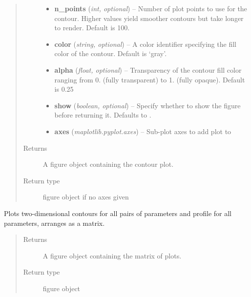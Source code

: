 \documentclass[a4paper,10pt,english]{sphinxmanual}
\begin{document}
\begin{fulllineitems}
\begin{fulllineitems}
\begin{quote}
\begin{description}
\begin{itemize}
\item {} 
\textbf{n\_points} (\emph{int, optional}) --
Number of plot points to use for the contour. Higher
values yield smoother contours but take longer to
render. Default is 100.

\item {} 
\textbf{color} (\emph{string, optional}) --
A  color identifier specifying the fill color
of the contour. Default is `gray'.

\item {} 
\textbf{alpha} (\emph{float, optional}) --
Transparency of the contour fill color ranging from 0. (fully
transparent) to 1. (fully opaque). Default is 0.25

\item {} 
\textbf{show} (\emph{boolean, optional}) --
Specify whether to show the figure before returning it. Defaults
to .

\item {} 
\textbf{axes} (\emph{maplotlib.pyplot.axes}) --
Sub-plot axes to add plot to

\end{itemize}

\item[{Returns}] \leavevmode
A figure object containing the contour plot.

\item[{Return type}] \leavevmode
{} figure object if no axes given

\end{description}\end{quote}

\end{fulllineitems}


\begin{fulllineitems}
\label{index:kafe.fit.Fit.plot_correlations}
Plots two-dimensional contours for all pairs of parameters
and profile for all parameters, arranges as a matrix.
\begin{quote}\begin{description}
\item[{Returns}] \leavevmode
A figure object containing the matrix of plots.

\item[{Return type}] \leavevmode
{} figure object

\end{description}\end{quote}


\end{fulllineitems}
\end{fulllineitems}
\end{document}
